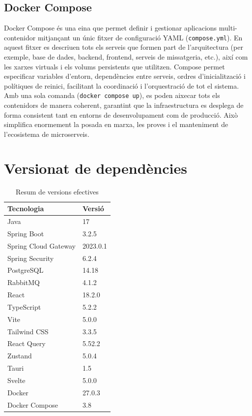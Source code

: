 \subsection*{Docker Compose}
Docker Compose és una eina que permet definir i gestionar aplicacions multi-contenidor mitjançant un únic fitxer de configuració YAML (\texttt{compose.yml}). En aquest fitxer es descriuen tots els serveis que formen part de l'arquitectura (per exemple, base de dades, backend, frontend, serveis de missatgeria, etc.), així com les xarxes virtuals i els volums persistents que utilitzen. Compose permet especificar variables d'entorn, dependències entre serveis, ordres d'inicialització i polítiques de reinici, facilitant la coordinació i l'orquestració de tot el sistema. Amb una sola comanda (\texttt{docker compose up}), es poden aixecar tots els contenidors de manera coherent, garantint que la infraestructura es desplega de forma consistent tant en entorns de desenvolupament com de producció. Això simplifica enormement la posada en marxa, les proves i el manteniment de l'ecosistema de microserveis.

\section{Versionat de dependències}

\begin{table}[H]
\centering
\caption{Resum de versions efectives}
\label{tab:versions}
\begin{tabular}{@{}p{5cm}p{3cm}@{}}
\toprule
\textbf{Tecnologia} & \textbf{Versió} \\
\midrule
Java & 17 \\
Spring Boot & 3.2.5 \\
Spring Cloud Gateway & 2023.0.1 \\
Spring Security & 6.2.4 \\
PostgreSQL & 14.18 \\
RabbitMQ & 4.1.2 \\
React & 18.2.0 \\
TypeScript & 5.2.2 \\
Vite & 5.0.0 \\
Tailwind CSS & 3.3.5 \\
React Query & 5.52.2 \\
Zustand & 5.0.4 \\
Tauri & 1.5 \\
Svelte & 5.0.0 \\
Docker & 27.0.3 \\
Docker Compose & 3.8 \\
\bottomrule
\end{tabular}
\end{table}


